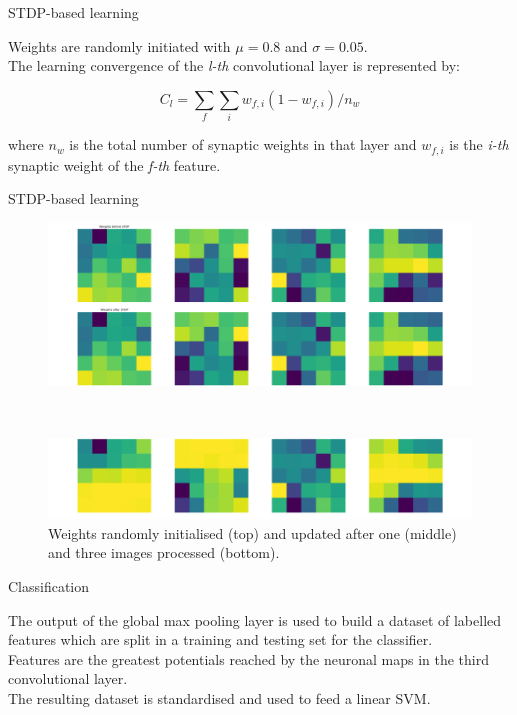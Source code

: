 \documentclass[10pt]{beamer}
\begin{document}
\begin{frame}{STDP-based learning}

Weights are randomly initiated with $ \mu = 0.8 $ and $ \sigma = 0.05 $.\\
\bigskip
The learning convergence of the \textit{l-th} convolutional layer is represented by:

\begin{equation*}
C_{l} = \sum_{f}\sum_{i}w_{f,i}(1-w_{f,i})/n_{w}
\end{equation*}

where $ n_{w} $ is the total number of synaptic weights in that layer and $ w_{f,i} $ is the \textit{i-th} synaptic weight of the \textit{f-th} feature.

\end{frame}

\begin{frame}{STDP-based learning}

\begin{figure}[!h]
	\centering
	\begin{minipage}[b]{\textwidth}
		\includegraphics[width=\textwidth]{images/Figure_15}
	\end{minipage}
	\\[0.5em] \begin{minipage}[b]{\textwidth}
		\includegraphics[width=\textwidth]{images/3Figure_15}
	\end{minipage}
	\hfill
	\caption{Weights randomly initialised (top) and updated after one (middle) and three images processed (bottom).}
\end{figure}

\end{frame}

\begin{frame}{Classification}

The output of the global max pooling layer is used to build a dataset of labelled
features which are split in a training and testing set for the classifier.\\
\bigskip
Features are the greatest potentials reached by the neuronal maps in the third convolutional layer.\\
\bigskip
The resulting dataset is standardised and used to feed a linear SVM.

\end{frame}
\end{document}
